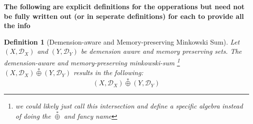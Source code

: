 \documentclass[11pt]{article}
\newtheorem{definition}{Definition}
\newcommand{\Dict}{\mathcal{D}} %
\newcommand{\starOplus}{\overset{*}{\oplus}} %
\begin{document}
\textbf{The following are explicit definitions for the opperations but need not be fully written out (or in seperate definitions) for each to provide all the info} 


\begin{definition}[Demension-aware and Memory-preserving Minkowski Sum]
	Let $(X,\Dict_{X})$ and $(Y,\Dict_{Y})$ be demension aware and memory preserving sets.
	The demension-aware and memory-preserving minkowski-sum \footnote{we could likely just call this intersection and define a specific algebra instead of doing the $\starOplus$ and fancy name} $(X,\Dict_{X}) \starOplus (Y,\Dict_{Y})$ results in the following:
	\begin{equation}
		(X,\Dict_{X}) \starOplus (Y,\Dict_{Y}) 
	\end{equation}
\end{definition}
\end{document}
